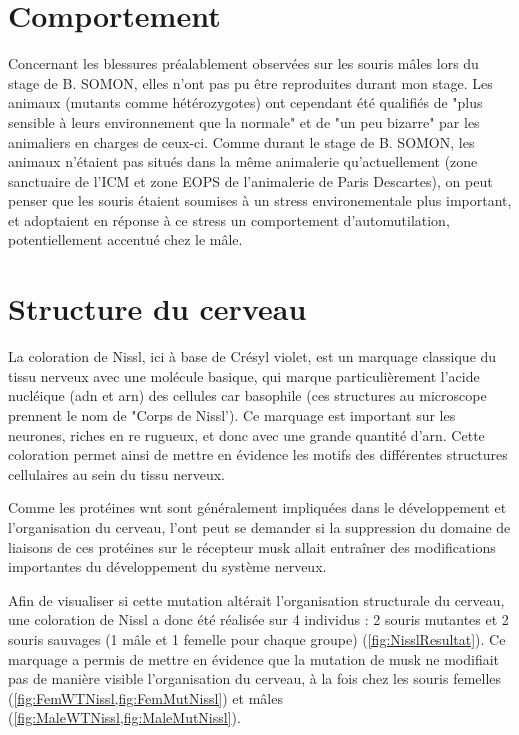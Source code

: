 \section{Comportement}
\label{sec:Comportement}
	Concernant les blessures préalablement observées sur les souris \mcrd mâles lors du stage de B. SOMON, elles n'ont pas pu être reproduites durant mon stage. Les animaux (mutants comme hétérozygotes) ont cependant été qualifiés de "plus sensible à leurs environnement que la normale" et de "un peu bizarre" par les animaliers en charges de ceux-ci. Comme durant le stage de B. SOMON, les animaux n'étaient pas situés dans la même animalerie qu'actuellement (zone sanctuaire de l'ICM et zone EOPS de l'animalerie de Paris Descartes), on peut penser que les souris étaient soumises à un stress environementale plus important, et adoptaient en réponse à ce stress un comportement d'automutilation, potentiellement accentué chez le mâle.

\section{Structure du cerveau}
\label{sec:NisslResultat}
	La coloration de Nissl, ici à base de Crésyl violet, est un marquage classique du tissu nerveux avec une molécule basique, qui marque particulièrement l'acide nucléique (\acrshort{adn} et \acrshort{arn}) des cellules car basophile (ces structures au microscope prennent le nom de "Corps de Nissl'). Ce marquage est important sur les neurones, riches en \gls{re} rugueux, et donc avec une grande quantité d'\acrshort{arn}. Cette coloration permet ainsi de mettre en évidence les motifs des différentes structures cellulaires au sein du tissu nerveux.

	Comme les protéines \gls{wnt} sont généralement impliquées dans le développement et l'organisation du cerveau, l'ont peut se demander si la suppression du domaine de liaisons de ces protéines sur le récepteur \gls{musk} allait entraîner des modifications importantes du développement du système nerveux.

	Afin de visualiser si cette mutation \mcrd altérait l'organisation structurale du cerveau, une coloration de Nissl a donc été réalisée sur 4 individus : 2 souris mutantes et 2 souris sauvages (1 mâle et 1 femelle pour chaque groupe) (\cref{fig:NisslResultat}). Ce marquage a permis de mettre en évidence que la mutation de \gls{musk} ne modifiait pas de manière visible l'organisation du cerveau, à la fois chez les souris femelles (\cref{fig:FemWTNissl,fig:FemMutNissl}) et mâles (\cref{fig:MaleWTNissl,fig:MaleMutNissl}). 

